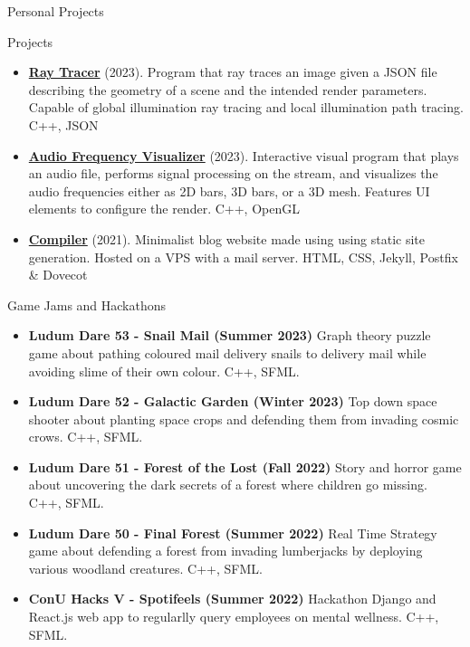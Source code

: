 \documentclass[]{mcdowellcv}
\begin{document}
	\begin{cvsection}{Personal Projects}
		\begin{cvsubsection}{Projects}{}{}
			\begin{itemize}
				\item \textbf{\href{https://github.com/adrientremblay/RayTracer}{Ray Tracer}} (2023). Program that ray traces an image given a JSON file describing the geometry of a scene and the intended render parameters. Capable of global illumination ray tracing and local illumination path tracing. C++, JSON 
                \item \textbf{\href{https://github.com/adrientremblay/AudioVisualizer}{Audio Frequency Visualizer}} (2023). Interactive visual program that plays an audio file, performs signal processing on the stream, and visualizes the audio frequencies either as 2D bars, 3D bars, or a 3D mesh. Features UI elements to configure the render. C++, OpenGL 
                \item \textbf{\href{https://github.com/adrientremblay/Compiler}{Compiler}} (2021).  Minimalist blog website made using using static site generation. Hosted on a VPS with a mail server. HTML, CSS, Jekyll, Postfix \& Dovecot
			\end{itemize}
		\end{cvsubsection}
	\end{cvsection}
	
	\begin{cvsection}{Game Jams and Hackathons}
		\begin{cvsubsection}{}{}{}	
			\begin{itemize}
				\item \textbf{Ludum Dare 53 - Snail Mail (Summer 2023)} Graph theory puzzle game about pathing coloured mail delivery snails to delivery mail while avoiding slime of their own colour. C++, SFML.
				\item \textbf{Ludum Dare 52 - Galactic Garden (Winter 2023)} Top down space shooter about planting space crops and defending them from invading cosmic crows. C++, SFML.
				\item \textbf{Ludum Dare 51 - Forest of the Lost (Fall 2022)} Story and horror game about uncovering the dark secrets of a forest where children go missing. C++, SFML.
				\item \textbf{Ludum Dare 50 - Final Forest (Summer 2022)} Real Time Strategy game about defending a forest from invading lumberjacks by deploying various woodland creatures. C++, SFML.
				\item \textbf{ConU Hacks V - Spotifeels (Summer 2022)} Hackathon Django and React.js web app to regularlly query employees on mental wellness. C++, SFML.
			\end{itemize}
		\end{cvsubsection}
	\end{cvsection}
	
\end{document}
